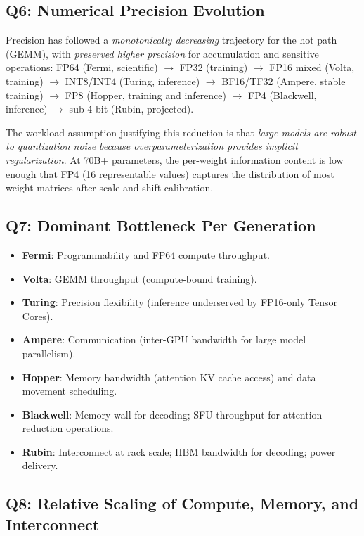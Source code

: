 \documentclass[10pt,twocolumn]{article}
\begin{document}
\subsection{Q6: Numerical Precision Evolution}

Precision has followed a \textit{monotonically decreasing} trajectory for the hot path (GEMM), with \textit{preserved higher precision} for accumulation and sensitive operations:
FP64 (Fermi, scientific) $\to$ FP32 (training) $\to$ FP16 mixed (Volta, training) $\to$ INT8/INT4 (Turing, inference) $\to$ BF16/TF32 (Ampere, stable training) $\to$ FP8 (Hopper, training and inference) $\to$ FP4 (Blackwell, inference) $\to$ sub-4-bit (Rubin, projected).

The workload assumption justifying this reduction is that \textit{large models are robust to quantization noise because overparameterization provides implicit regularization}. At 70B+ parameters, the per-weight information content is low enough that FP4 (16 representable values) captures the distribution of most weight matrices after scale-and-shift calibration.

\subsection{Q7: Dominant Bottleneck Per Generation}

\begin{itemize}
\item \textbf{Fermi}: Programmability and FP64 compute throughput.
\item \textbf{Volta}: GEMM throughput (compute-bound training).
\item \textbf{Turing}: Precision flexibility (inference underserved by FP16-only Tensor Cores).
\item \textbf{Ampere}: Communication (inter-GPU bandwidth for large model parallelism).
\item \textbf{Hopper}: Memory bandwidth (attention KV cache access) and data movement scheduling.
\item \textbf{Blackwell}: Memory wall for decoding; SFU throughput for attention reduction operations.
\item \textbf{Rubin}: Interconnect at rack scale; HBM bandwidth for decoding; power delivery.
\end{itemize}

\subsection{Q8: Relative Scaling of Compute, Memory, and Interconnect}
\end{document}
